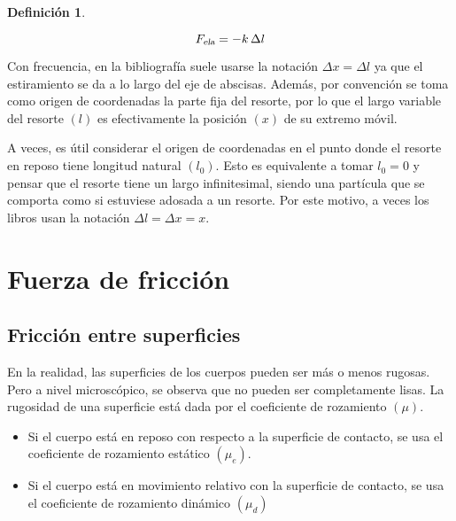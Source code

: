\documentclass[a5paper,12pt,twoside]{book}
\newtheorem{defn}{{Definición}}[chapter]
\begin{document}
\begin{mdframed}[style=MyFrame1]
    \begin{defn}
        \label{defn:elasticForce}
    \end{defn}
    \begin{equation*}
        {{F}_\textsl{{ela}}} = -k \, \Delta l
    \end{equation*}
\end{mdframed}

Con frecuencia, en la bibliografía suele usarse la notación $\Delta x=\Delta l$ ya que el estiramiento se da a lo largo del eje de abscisas. Además, por convención se toma como origen de coordenadas la parte fija del resorte, por lo que el largo variable del resorte $(l)$ es efectivamente la posición $(x)$ de su extremo móvil.

A veces, es útil considerar el origen de coordenadas en el punto donde el resorte en reposo tiene longitud natural $(l_0)$. Esto es equivalente a tomar $l_0 = 0$ y pensar que el resorte tiene un largo infinitesimal, siendo una partícula que se comporta como si estuviese adosada a un resorte. Por este motivo, a veces los libros usan la notación $\Delta l = \Delta x = x$.


\section{Fuerza de fricción}

\subsection{Fricción entre superficies}

En la realidad, las superficies de los cuerpos pueden ser más o menos rugosas. Pero a nivel microscópico, se observa que no pueden ser completamente lisas. La rugosidad de una superficie está dada por el coeficiente de rozamiento $(\mu)$.

\begin{itemize}
    \item  Si el cuerpo está en reposo con respecto a la superficie de contacto, se usa el coeficiente de rozamiento   estático $(\mu_e)$.
    
    \item Si el cuerpo está en movimiento relativo con la superficie de contacto, se usa el coeficiente de rozamiento   dinámico $(\mu_d)$
\end{itemize}

\begin{center}
    \vspace{-2cm}
    \def\svgwidth{\linewidth}
    
    \vspace{-2cm}
\end{center}
\end{document}
